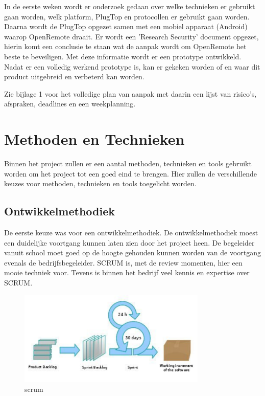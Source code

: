 \documentclass[]{article}
\begin{document}
In de eerste weken wordt  er  onderzoek  gedaan  over  welke  technieken  er
gebruikt gaan worden, welk platform,  PlugTop  en  protocollen  er  gebruikt
gaan worden. Daarna wordt de PlugTop opgezet samen met een  mobiel  apparaat
(Android)  waarop  OpenRemote  draait.  Er  wordt  een  'Research  Security'
document opgezet, hierin komt een conclusie te staan wat de aanpak wordt  om
OpenRemote het beste  te  beveiligen.  Met  deze  informatie  wordt  er  een
prototype ontwikkeld. Nadat er een volledig werkend  prototype  is,  kan  er
gekeken worden of en waar dit product uitgebreid en verbeterd kan worden.

Zie bijlage 1 voor het volledige plan van aanpak met daarin een lijst  van
risico's,  afspraken,  deadlines  en  een weekplanning.

\newpage
\section{Methoden en Technieken}

Binnen het project zullen er een aantal methoden, technieken en tools
gebruikt worden om het project tot een goed eind te brengen. Hier zullen de
verschillende keuzes voor methoden, technieken en tools toegelicht worden.

\subsection{Ontwikkelmethodiek}
De eerste keuze was voor een ontwikkelmethodiek. De ontwikkelmethodiek
moest een duidelijke voortgang kunnen laten zien door het project heen. De
begeleider vanuit school moet goed op de hoogte gehouden kunnen worden van
de voortgang evenals de bedrijfsbegeleider. SCRUM is, met de review
momenten, hier een mooie techniek voor. Tevens is binnen het bedrijf veel
kennis en expertise over SCRUM.

\begin{figure}[htpb]
  \begin{center}
    \includegraphics[width=0.80\textwidth]{scrum.pdf}
  \end{center}
  \caption{scrum}
\end{figure}
\end{document}
